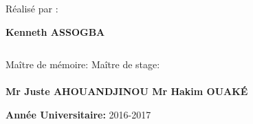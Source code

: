 \begin{titlepage}
    
\[\]

\begin{center}
Réalisé par : 
\end{center}

\begin{center}
\textbf{Kenneth ASSOGBA}
\end{center}

\[\]

Maître de mémoire: \qquad\qquad\qquad\qquad\qquad\qquad\qquad\qquad\qquad\qquad\qquad\qquad\qquad\qquad \quad Maître de stage:
\\\\\bf{Mr Juste AHOUANDJINOU} \qquad\qquad\qquad\qquad\qquad\qquad\qquad\qquad\qquad\qquad\qquad\qquad   \quad\bf{ Mr Hakim OUAK\'E}
 
    \vspace*{3cm}

     \begin{center}
     \textbf{Ann\'ee Universitaire:} 2016-2017
     \end{center}
     \vspace*{3cm}

 \end{titlepage}